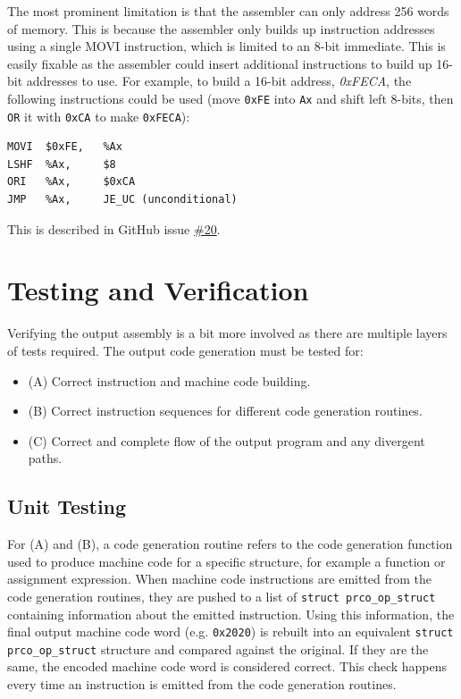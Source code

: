 \documentclass[11pt,a4paper]{report}
\begin{document}
The most prominent limitation is that the assembler can only address 256 words of memory. This is because the assembler only builds up instruction addresses using a single MOVI instruction, which is limited to an 8-bit immediate. This is easily fixable as the assembler could insert additional instructions to build up 16-bit addresses to use. For example, to build a 16-bit address, \textit{0xFECA}, the following instructions could be used (move \verb|0xFE| into \verb|Ax| and shift left 8-bits, then \verb|OR| it with \verb|0xCA| to make \verb|0xFECA|):
\begin{verbatim}
MOVI  $0xFE,   %Ax
LSHF  %Ax,     $8
ORI   %Ax,     $0xCA
JMP   %Ax,     JE_UC (unconditional)
\end{verbatim}
This is described in GitHub issue \href{https://github.com/bendl/prco304/issues/20}{\#20}.

\section{Testing and Verification}
Verifying the output assembly is a bit more involved as there are multiple layers of tests required. The output code generation must be tested for:
\begin{itemize}
\item{(A) Correct instruction and machine code building.}
\item{(B) Correct instruction sequences for different code generation routines.}
\item{(C) Correct and complete flow of the output program and any divergent paths.}
\end{itemize}

\subsection*{Unit Testing}
For (A) and (B), a code generation routine refers to the code generation function used to produce machine code for a specific structure, for example a function or assignment expression. When machine code instructions are emitted from the code generation routines, they are pushed to a list of \texttt{struct prco_op_struct} containing information about the emitted instruction. Using this information, the final output machine code word (e.g. \texttt{0x2020}) is rebuilt into an equivalent \texttt{struct prco_op_struct} structure and compared against the original. If they are the same, the encoded machine code word is considered correct. This check happens every time an instruction is emitted from the code generation routines.
\end{document}
